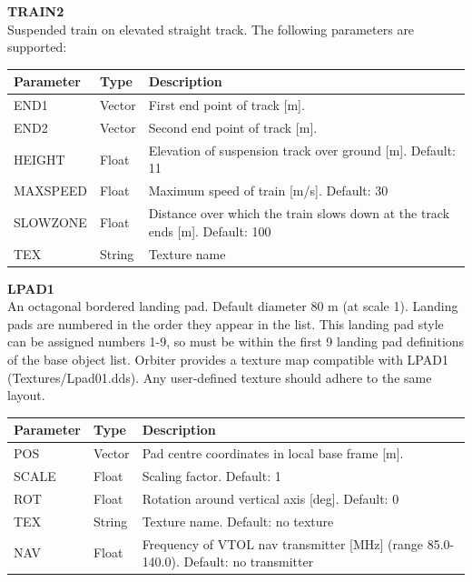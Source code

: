 \documentclass[Orbiter Developer Manual.tex]{subfiles}
\begin{document}
\noindent
\textbf{TRAIN2}\\
Suspended train on elevated straight track. The following parameters are supported:

	\begin{longtable}{ |p{}|p{}|p{}| }
	\hline\rule{0pt}{2ex}
	\textbf{Parameter} & \textbf{Type} & \textbf{Description}\\
	\hline\rule{0pt}{2ex}
	END1 & Vector & First end point of track [m].\\
	\hline\rule{0pt}{2ex}
	END2 & Vector & Second end point of track [m].\\
	\hline\rule{0pt}{2ex}
	HEIGHT & Float & Elevation of suspension track over ground [m]. Default: 11\\
	\hline\rule{0pt}{2ex}
	MAXSPEED & Float & Maximum speed of train [m/s]. Default: 30\\
	\hline\rule{0pt}{2ex}
	SLOWZONE & Float & Distance over which the train slows down at the track ends [m]. Default: 100\\
	\hline\rule{0pt}{2ex}
	TEX & String & Texture name\\
	\hline
	\end{longtable}

\noindent
\textbf{LPAD1}\\
An octagonal bordered landing pad. Default diameter 80 m (at scale 1). Landing pads are numbered in the order they appear in the list. This landing pad style can be assigned numbers 1-9, so must be within the first 9 landing pad definitions of the base object list. Orbiter provides a texture map compatible with LPAD1 (Textures/Lpad01.dds). Any user-defined texture should adhere to the same layout.

	\begin{longtable}{ |p{}|p{}|p{}| }
	\hline\rule{0pt}{2ex}
	\textbf{Parameter} & \textbf{Type} & \textbf{Description}\\
	\hline\rule{0pt}{2ex}
	POS & Vector & Pad centre coordinates in local base frame [m].\\
	\hline\rule{0pt}{2ex}
	SCALE & Float & Scaling factor. Default: 1\\
	\hline\rule{0pt}{2ex}
	ROT & Float & Rotation around vertical axis [deg]. Default: 0\\
	\hline\rule{0pt}{2ex}
	TEX & String & Texture name. Default: no texture\\
	\hline\rule{0pt}{2ex}
	NAV & Float & Frequency of VTOL nav transmitter [MHz] (range 85.0-140.0). Default: no transmitter\\
	\hline
	\end{longtable}
\end{document}
